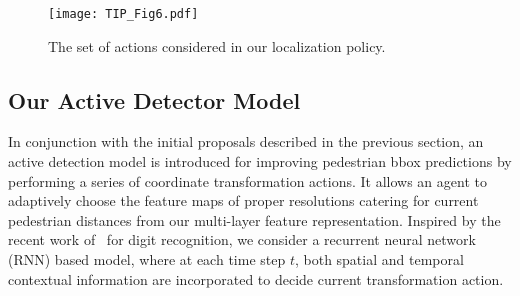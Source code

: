 \documentclass[10pt,journal,compsoc,twoside]{IEEEtran}
\begin{document}
\begin{figure}[!t]
\centering
\texttt{[image: TIP\_Fig6.pdf]}
\caption{The set of actions considered in our localization policy.}
\label{fig_6}
\end{figure}


\subsection{Our Active Detector Model}

In conjunction with the initial proposals described in the previous section,
an active detection model is introduced for improving pedestrian bbox predictions by performing a series of coordinate transformation actions.
It allows an agent to adaptively choose the feature maps of proper resolutions catering for current pedestrian distances from our multi-layer feature representation.
Inspired by the recent work of~\cite{MnihEtAl:nips14} for digit recognition, we consider a recurrent neural network (RNN) based model,
where at each time step $t$, both spatial and temporal contextual information are incorporated to decide current transformation action.
\end{document}

